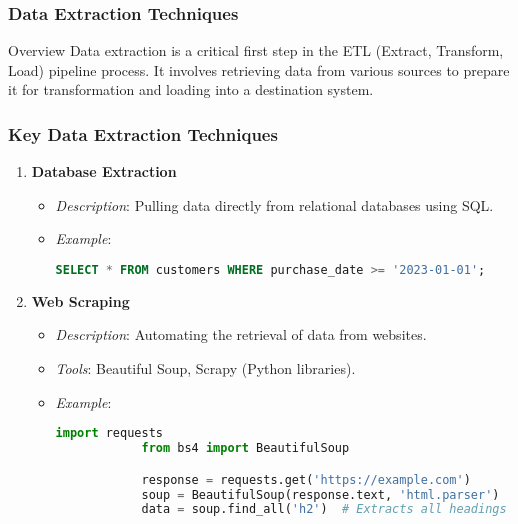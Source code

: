 \documentclass[aspectratio=169]{beamer}
\begin{document}
\begin{frame}
    \frametitle{Data Extraction Techniques}
    \begin{block}{Overview}
        Data extraction is a critical first step in the ETL (Extract, Transform, Load) pipeline process. It involves retrieving data from various sources to prepare it for transformation and loading into a destination system.
    \end{block}
\end{frame}

\begin{frame}
    \frametitle{Key Data Extraction Techniques}
    \begin{enumerate}
        \item \textbf{Database Extraction} 
        \begin{itemize}
            \item \textit{Description}: Pulling data directly from relational databases using SQL.
            \item \textit{Example}:
            \begin{lstlisting}[language=SQL]
            SELECT * FROM customers WHERE purchase_date >= '2023-01-01';
            \end{lstlisting}
        \end{itemize}
        
        \item \textbf{Web Scraping} 
        \begin{itemize}
            \item \textit{Description}: Automating the retrieval of data from websites.
            \item \textit{Tools}: Beautiful Soup, Scrapy (Python libraries).
            \item \textit{Example}:
            \begin{lstlisting}[language=Python]
            import requests
            from bs4 import BeautifulSoup

            response = requests.get('https://example.com')
            soup = BeautifulSoup(response.text, 'html.parser')
            data = soup.find_all('h2')  # Extracts all headings from the webpage.
            \end{lstlisting}
        \end{itemize}
    \end{enumerate}
\end{frame}
\end{document}
